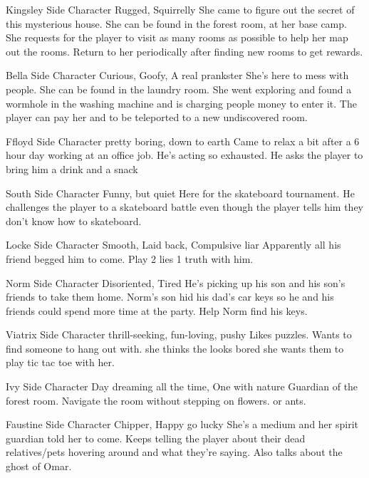 {Kingsley}
{Side Character}
{Rugged, Squirrelly}
{She came to figure out the secret of this mysterious house.}
{She can be found in the forest room, at her base camp. She requests for the player to visit as many rooms as possible to help her map out the rooms. Return to her periodically after finding new rooms to get rewards.}

{Bella}
{Side Character}
{Curious, Goofy, A real prankster}
{She's here to mess with people.}
{She can be found in the laundry room. She went exploring and found a wormhole in the washing machine and is charging people money to enter it. The player can pay her and to be teleported to a new undiscovered room.}

{Ffloyd}
{Side Character}
{pretty boring, down to earth}
{Came to relax a bit after a 6 hour day working at an office job.}
{He's acting so exhausted. He asks the player to bring him a drink and a snack}

{South}
{Side Character}
{Funny, but quiet}
{Here for the skateboard tournament.}
{He challenges the player to a skateboard battle even though the player tells him they don't know how to skateboard.}

{Locke}
{Side Character}
{Smooth, Laid back, Compulsive liar}
{Apparently all his friend begged him to come.}
{Play 2 lies 1 truth with him.}

{Norm}
{Side Character}
{Disoriented, Tired}
{He's picking up his son and his son's friends to take them home.}
{Norm's son hid his dad's car keys so he and his friends could spend more time at the party. Help Norm find his keys.}

{Viatrix}
{Side Character}
{thrill-seeking, fun-loving, pushy}
{Likes puzzles. Wants to find someone to hang out with.}
{she thinks the looks bored she wants them to play tic tac toe with her.}

{Ivy}
{Side Character}
{Day dreaming all the time, One with nature}
{Guardian of the forest room.}
{Navigate the room without stepping on flowers. or ants.}

{Faustine}
{Side Character}
{Chipper, Happy go lucky}
{She's a medium and her spirit guardian told her to come.}
{Keeps telling the player about their dead relatives/pets hovering around and what they're saying. Also talks about the ghost of Omar.}

